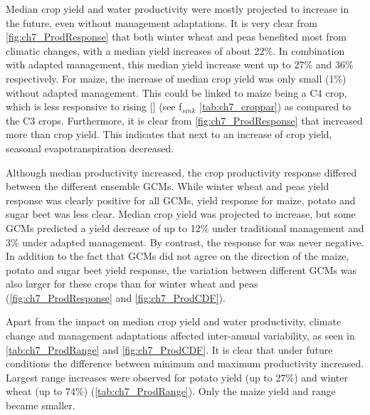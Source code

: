 Median crop yield and water productivity were mostly projected to increase in the future, even without management adaptations. It is very clear from \autoref{fig:ch7_ProdResponse} that both winter wheat and peas benefited most from climatic changes, with a median yield increases of about 22\%. In combination with adapted management, this median yield increase went up to 27\% and 36\% respectively. For maize, the increase of median crop yield was only small (1\%) without adapted management. This could be linked to maize being a C4 crop, which is less responsive to rising [\COtwo] (see f$_{sink}$ \autoref{tab:ch7_croppar}) as compared to the C3 crops. Furthermore, it is clear from \autoref{fig:ch7_ProdResponse} that \WPET increased more than crop yield. This indicates that next to an increase of crop yield, seasonal evapotranspiration decreased. 

Although median productivity increased, the crop productivity response differed between the different ensemble GCMs. While winter wheat and peas yield response was clearly positive for all GCMs, yield response for maize, potato and sugar beet was less clear. Median crop yield was projected to increase, but some GCMs predicted a yield decrease of up to 12\% under traditional management and 3\% under adapted management. By contrast, the response for \WPET was never negative. In addition to the fact that GCMs did not agree on the direction of the maize, potato and sugar beet yield response, the variation between different GCMs was also larger for these crops than for winter wheat and peas (\autoref{fig:ch7_ProdResponse} and \autoref{fig:ch7_ProdCDF}). 

Apart from the impact on median crop yield and water productivity, climate change and management adaptations affected inter-annual variability, as seen in \autoref{tab:ch7_ProdRange} and \autoref{fig:ch7_ProdCDF}. It is clear that under future conditions the difference between minimum and maximum productivity increased. Largest range increases were observed for potato yield (up to 27\%) and winter wheat \WPET (up to 74\%) (\autoref{tab:ch7_ProdRange}). Only the maize yield and \WPET range became smaller. 

